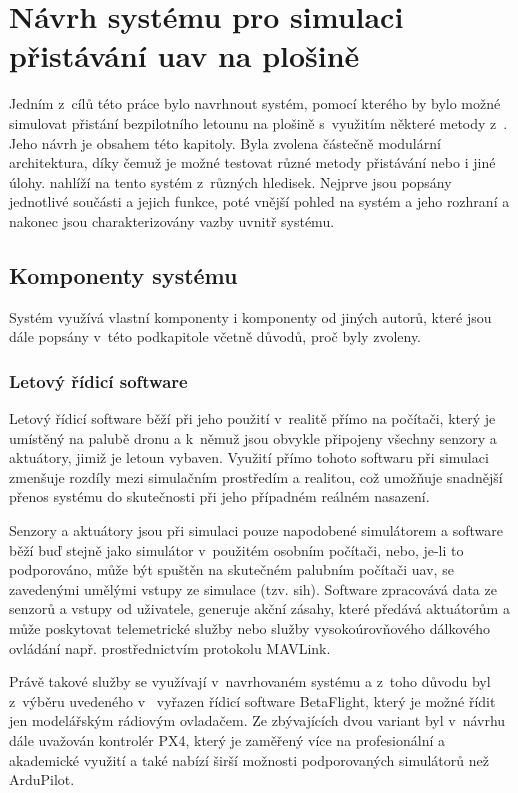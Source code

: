 \chapter{Návrh systému pro simulaci přistávání \acrshort{uav} na plošině} \label{chap:system}
  Jedním z~cílů této práce bylo navrhnout systém, pomocí kterého by bylo možné simulovat přistání bezpilotního letounu na plošině s~využitím některé metody z~. Jeho návrh je obsahem této kapitoly. Byla zvolena částečně modulární architektura, díky čemuž je možné testovat různé metody přistávání nebo i jiné úlohy.  nahlíží na tento systém z~různých hledisek. Nejprve jsou popsány jednotlivé součásti a jejich funkce, poté vnější pohled na systém a jeho rozhraní a nakonec jsou charakterizovány vazby uvnitř systému.
  
  \section{Komponenty systému} \label{sec:components}
  Systém využívá vlastní komponenty i komponenty od jiných autorů, které jsou dále popsány v~této podkapitole včetně důvodů, proč byly zvoleny.
    \subsection{Letový řídicí software}
      Letový řídicí software běží při jeho použití v~realitě přímo na počítači, který je umístěný na palubě dronu a k~němuž jsou obvykle připojeny všechny senzory a aktuátory, jimiž je letoun vybaven. Využití přímo tohoto softwaru při simulaci zmenšuje rozdíly mezi simulačním prostředím a realitou, což umožňuje snadnější přenos systému do skutečnosti při jeho případném reálném nasazení.
      
      Senzory a aktuátory jsou při simulaci pouze napodobené simulátorem a software běží buď stejně jako simulátor v~použitém osobním počítači, nebo, je-li to podporováno, může být spuštěn na skutečném palubním počítači \acrshort{uav}, se zavedenými umělými vstupy ze simulace (tzv. \acrfull{sih}). Software zpracovává data ze senzorů a vstupy od uživatele, generuje akční zásahy, které předává aktuátorům a může poskytovat telemetrické služby nebo služby vysokoúrovňového dálkového ovládání např. prostřednictvím protokolu MAVLink.
      
      Právě takové služby se využívají v~navrhovaném systému a z~toho důvodu byl z~výběru uvedeného v~ vyřazen řídicí software BetaFlight, který je možné řídit jen modelářským rádiovým ovladačem. Ze zbývajících dvou variant byl v~návrhu dále uvažován kontrolér PX4, který je zaměřený více na profesionální a akademické využití a také nabízí širší možnosti podporovaných simulátorů než ArduPilot.
